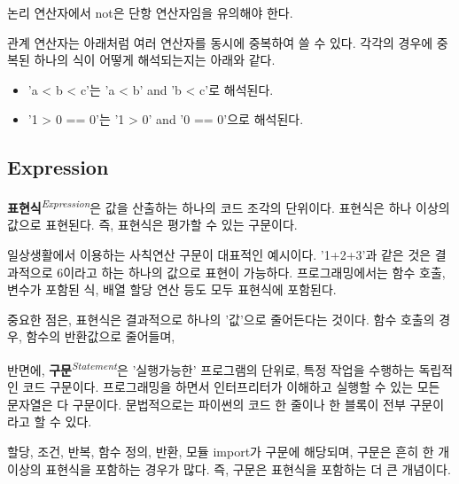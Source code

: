 논리 연산자에서 not은 단항 연산자임을 유의해야 한다.

관계 연산자는 아래처럼 여러 연산자를 동시에 중복하여 쓸 수 있다. 각각의 경우에 중복된 하나의 식이 어떻게 해석되는지는 아래와 같다.

\begin{itemize}
    \item 'a < b < c'는 'a < b' and 'b < c'로 해석된다.
    \item '1 > 0 == 0'는 '1 > 0' and '0 == 0'으로 해석된다.
\end{itemize}

\subsection{Expression}

\textbf{표현식}\textit{\textsuperscript{Expression}}은 값을 산출하는 하나의 코드 조각의 단위이다. 표현식은 하나 이상의 값으로 표현된다. 즉, 표현식은 평가할 수 있는 구문이다.

일상생활에서 이용하는 사칙연산 구문이 대표적인 예시이다. '1+2+3'과 같은 것은 결과적으로 6이라고 하는 하나의 값으로 표현이 가능하다. 프로그래밍에서는 함수 호출, 변수가 포함된 식, 배열 할당 연산 등도 모두 표현식에 포함된다.

중요한 점은, 표현식은 결과적으로 하나의 '값'으로 줄어든다는 것이다. 함수 호출의 경우, 함수의 반환값으로 줄어들며, 

반면에, \textbf{구문}\textit{\textsuperscript{Statement}}은 '실행가능한' 프로그램의 단위로, 특정 작업을 수행하는 독립적인 코드 구문이다. 프로그래밍을 하면서 인터프리터가 이해하고 실행할 수 있는 모든 문자열은 다 구문이다. 문법적으로는 파이썬의 코드 한 줄이나 한 블록이 전부 구문이라고 할 수 있다.

할당, 조건, 반복, 함수 정의, 반환, 모듈 import가 구문에 해당되며, 구문은 흔히 한 개 이상의 표현식을 포함하는 경우가 많다. 즉, 구문은 표현식을 포함하는 더 큰 개념이다.
